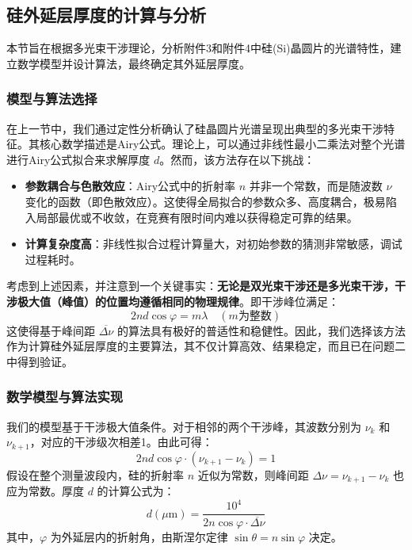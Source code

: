 \documentclass[withoutpreface,bwprint]{cumcmthesis} %
\begin{document}
\subsection{硅外延层厚度的计算与分析}

本节旨在根据多光束干涉理论，分析附件3和附件4中硅(Si)晶圆片的光谱特性，建立数学模型并设计算法，最终确定其外延层厚度。

\subsubsection{模型与算法选择}

在上一节中，我们通过定性分析确认了硅晶圆片光谱呈现出典型的多光束干涉特征。其核心数学描述是Airy公式。理论上，可以通过非线性最小二乘法对整个光谱进行Airy公式拟合来求解厚度 $d$。然而，该方法存在以下挑战：
\begin{itemize}
    \item \textbf{参数耦合与色散效应}：Airy公式中的折射率 $n$ 并非一个常数，而是随波数 $\nu$ 变化的函数（即色散效应）。这使得全局拟合的参数众多、高度耦合，极易陷入局部最优或不收敛，在竞赛有限时间内难以获得稳定可靠的结果。
    \item \textbf{计算复杂度高}：非线性拟合过程计算量大，对初始参数的猜测非常敏感，调试过程耗时。
\end{itemize}

考虑到上述因素，并注意到一个关键事实：\textbf{无论是双光束干涉还是多光束干涉，干涉极大值（峰值）的位置均遵循相同的物理规律}。即干涉峰位满足：
$$
    2nd\cos\varphi = m\lambda \quad (m \text{为整数})
$$
这使得基于峰间距 $\overline{\Delta\nu}$ 的算法具有极好的普适性和稳健性。因此，我们选择该方法作为计算硅外延层厚度的主要算法，其不仅计算高效、结果稳定，而且已在问题二中得到验证。

\subsubsection{数学模型与算法实现}

我们的模型基于干涉极大值条件。对于相邻的两个干涉峰，其波数分别为 $\nu_k$ 和 $\nu_{k+1}$，对应的干涉级次相差1。由此可得：
$$
    2nd\cos\varphi \cdot (\nu_{k+1} - \nu_k) = 1
$$
假设在整个测量波段内，硅的折射率 $n$ 近似为常数，则峰间距 $\Delta\nu = \nu_{k+1} - \nu_k$ 也应为常数。厚度 $d$ 的计算公式为：
$$
    d (\mu\text{m}) = \frac{10^4}{2n\cos\varphi \cdot \overline{\Delta\nu}}
$$
其中，$\varphi$ 为外延层内的折射角，由斯涅尔定律 $\sin\theta = n\sin\varphi$ 决定。
\end{document}
